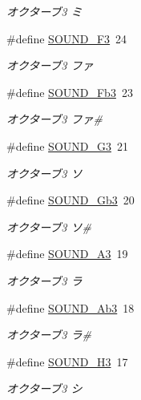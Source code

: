 \begin{DoxyCompactItemize}
\begin{DoxyCompactList}\small\item\em オクターブ3 ミ \end{DoxyCompactList}\item 
\#define \hyperlink{sound_8h_aee1dad36946f9a025e2067788b62e575_aee1dad36946f9a025e2067788b62e575}{S\+O\+U\+N\+D\+\_\+\+F3}~24
\begin{DoxyCompactList}\small\item\em オクターブ3 ファ \end{DoxyCompactList}\item 
\#define \hyperlink{sound_8h_a4502a83bac176348b5c7b0677341fc26_a4502a83bac176348b5c7b0677341fc26}{S\+O\+U\+N\+D\+\_\+\+Fb3}~23
\begin{DoxyCompactList}\small\item\em オクターブ3 ファ\# \end{DoxyCompactList}\item 
\#define \hyperlink{sound_8h_a3dc460e8030ea66b5b0af7074f32b3ac_a3dc460e8030ea66b5b0af7074f32b3ac}{S\+O\+U\+N\+D\+\_\+\+G3}~21
\begin{DoxyCompactList}\small\item\em オクターブ3 ソ \end{DoxyCompactList}\item 
\#define \hyperlink{sound_8h_a154622a25029a712f113945150b1325b_a154622a25029a712f113945150b1325b}{S\+O\+U\+N\+D\+\_\+\+Gb3}~20
\begin{DoxyCompactList}\small\item\em オクターブ3 ソ\# \end{DoxyCompactList}\item 
\#define \hyperlink{sound_8h_a9f45e8626868aaf3fe91e01a56686ecd_a9f45e8626868aaf3fe91e01a56686ecd}{S\+O\+U\+N\+D\+\_\+\+A3}~19
\begin{DoxyCompactList}\small\item\em オクターブ3 ラ \end{DoxyCompactList}\item 
\#define \hyperlink{sound_8h_a41403a0a136d706e529e4017966e1a10_a41403a0a136d706e529e4017966e1a10}{S\+O\+U\+N\+D\+\_\+\+Ab3}~18
\begin{DoxyCompactList}\small\item\em オクターブ3 ラ\# \end{DoxyCompactList}\item 
\#define \hyperlink{sound_8h_a931824d8aaced5b4db469aa58517d993_a931824d8aaced5b4db469aa58517d993}{S\+O\+U\+N\+D\+\_\+\+H3}~17
\begin{DoxyCompactList}\small\item\em オクターブ3 シ \end{DoxyCompactList}\end{DoxyCompactItemize}
